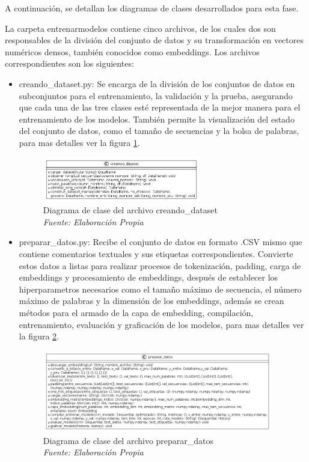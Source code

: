 A continuación, se detallan los diagramas de clases desarrollados para esta fase.

 La carpeta entrenarmodelos contiene cinco archivos, de los cuales dos son responsables de la división del conjunto de datos y su transformación en vectores numéricos densos, también conocidos como embeddings. Los archivos correspondientes son los siguientes: 

\begin{itemize}

\item creando\_dataset.py: Se encarga de la división de los conjuntos de datos en subconjuntos para el entrenamiento, la validación y la prueba, asegurando que cada una de las tres clases esté representada de la mejor manera para el entrenamiento de los modelos. También permite la visualización del estado del conjunto de datos, como el tamaño de secuencias y la bolsa de palabras, para mas detalles ver la figura \ref{fig:uml7}.

\begin{figure}
	\includegraphics[width=0.65\textwidth]{capitulo5/figuras/fig7.png}
	\caption{Diagrama de clase del archivo creando\_dataset
		\\\textit{Fuente: Elaboración Propia}}
	\label{fig:uml7}
\end{figure}

\item preparar\_datos.py: Recibe el conjunto de datos en formato .CSV mismo que contiene comentarios textuales y sus etiquetas correspondientes. Convierte estos datos a listas para realizar procesos de tokenización, padding, carga de embeddings y procesamiento de embeddings, después de establecer los hiperparametros necesarios como el tamaño máximo de secuencia, el número máximo de palabras y la dimensión de los embeddings, además se crean métodos para el armado de la capa de embedding, compilación, entrenamiento, evaluación y graficación de los modelos, para mas detalles ver la figura \ref{fig:uml8}.

\begin{figure}[h!]
	\includegraphics[width=0.95\textwidth]{capitulo5/figuras/fig8.png}
	\caption{Diagrama de clase del archivo preparar\_datos
		\\\textit{Fuente: Elaboración Propia}}
	\label{fig:uml8}
\end{figure}

\end{itemize}


